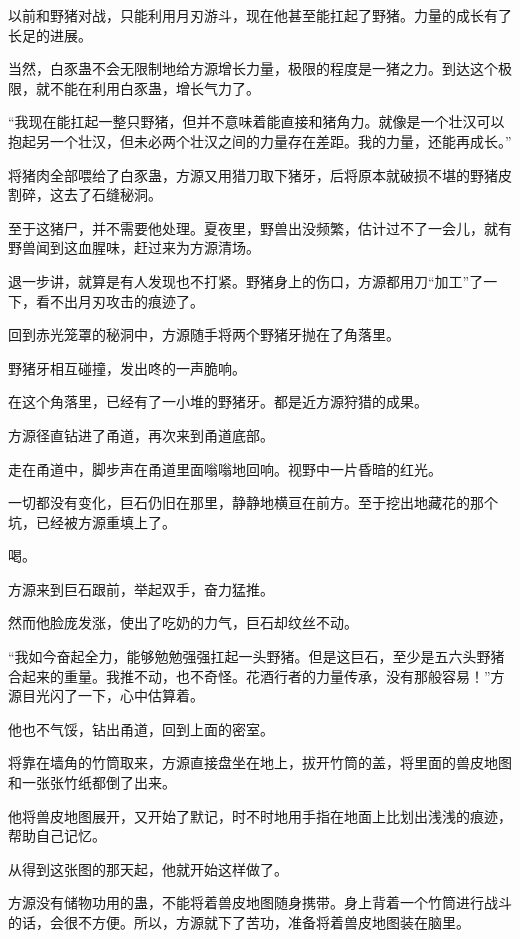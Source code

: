 \begin{this_body}
以前和野猪对战，只能利用月刃游斗，现在他甚至能扛起了野猪。力量的成长有了长足的进展。

当然，白豕蛊不会无限制地给方源增长力量，极限的程度是一猪之力。到达这个极限，就不能在利用白豕蛊，增长气力了。

“我现在能扛起一整只野猪，但并不意味着能直接和猪角力。就像是一个壮汉可以抱起另一个壮汉，但未必两个壮汉之间的力量存在差距。我的力量，还能再成长。”

将猪肉全部喂给了白豕蛊，方源又用猎刀取下猪牙，后将原本就破损不堪的野猪皮割碎，这去了石缝秘洞。

至于这猪尸，并不需要他处理。夏夜里，野兽出没频繁，估计过不了一会儿，就有野兽闻到这血腥味，赶过来为方源清场。

退一步讲，就算是有人发现也不打紧。野猪身上的伤口，方源都用刀“加工”了一下，看不出月刃攻击的痕迹了。

回到赤光笼罩的秘洞中，方源随手将两个野猪牙抛在了角落里。

野猪牙相互碰撞，发出咚的一声脆响。

在这个角落里，已经有了一小堆的野猪牙。都是近方源狩猎的成果。

方源径直钻进了甬道，再次来到甬道底部。

走在甬道中，脚步声在甬道里面嗡嗡地回响。视野中一片昏暗的红光。

一切都没有变化，巨石仍旧在那里，静静地横亘在前方。至于挖出地藏花的那个坑，已经被方源重填上了。

喝。

方源来到巨石跟前，举起双手，奋力猛推。

然而他脸庞发涨，使出了吃奶的力气，巨石却纹丝不动。

“我如今奋起全力，能够勉勉强强扛起一头野猪。但是这巨石，至少是五六头野猪合起来的重量。我推不动，也不奇怪。花酒行者的力量传承，没有那般容易！”方源目光闪了一下，心中估算着。

他也不气馁，钻出甬道，回到上面的密室。

将靠在墙角的竹筒取来，方源直接盘坐在地上，拔开竹筒的盖，将里面的兽皮地图和一张张竹纸都倒了出来。

他将兽皮地图展开，又开始了默记，时不时地用手指在地面上比划出浅浅的痕迹，帮助自己记忆。

从得到这张图的那天起，他就开始这样做了。

方源没有储物功用的蛊，不能将着兽皮地图随身携带。身上背着一个竹筒进行战斗的话，会很不方便。所以，方源就下了苦功，准备将着兽皮地图装在脑里。


\end{this_body}
